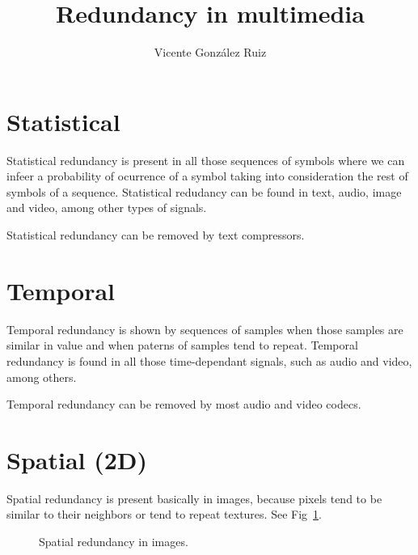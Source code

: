 
\title{Redundancy in multimedia}
\author{Vicente González Ruiz}
\maketitle

\section{Statistical}
Statistical redundancy is present in all those sequences of symbols
where we can infeer a probability of ocurrence of a symbol
taking into consideration the rest of symbols of a
sequence. Statistical redudancy can be found in text, audio, image and
video, among other types of signals.

Statistical redundancy can be removed by text compressors.

\section{Temporal}
Temporal redundancy is shown by sequences of samples when those
samples are similar in value and when paterns of samples tend to
repeat. Temporal redundancy is found in all those time-dependant
signals, such as audio and video, among others.

Temporal redundancy can be removed by most audio and video codecs.

\section{Spatial (2D)}
Spatial redundancy is present basically in images, because pixels tend
to be similar to their neighbors or tend to repeat textures. See
Fig~\ref{fig:correlacion_lena}.

\begin{figure}
  \caption{Spatial redundancy in images.}
  \label{fig:correlacion_lena}
\end{figure}

%
